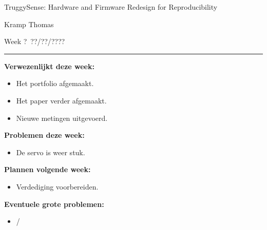 \documentclass[11pt,a4paper]{article}
\newcommand{\documenttitle}{TruggySense: Hardware and Firmware Redesign for Reproducibility}
\newcommand{\documentauthor}{Kramp Thomas}
\newcommand{\HUGE}{\fontsize{30}{30}\selectfont}
\providecommand{\ReportDate}{??/??/????}
\providecommand{\ReportWeek}{?}
\begin{document}
{\HUGE \documenttitle \par}

\vspace{-0.6em}
{\large \documentauthor \par}

\vspace{0.4em}
Week \ReportWeek\ \ReportDate

\vspace{-1.6em}
\noindent\rule{\textwidth}{0.4pt}


\vspace{1.5em}
\textbf{Verwezenlijkt deze week:}
\begin{itemize}
    \item Het portfolio afgemaakt.
    \item Het paper verder afgemaakt.
    \item Nieuwe metingen uitgevoerd.
\end{itemize}


\vspace{1em}
\textbf{Problemen deze week:}
\begin{itemize}
    \item De servo is weer stuk.
\end{itemize}


\vspace{1em}
\textbf{Plannen volgende week:}
\begin{itemize}
    \item Verdediging voorbereiden.
\end{itemize}


\vspace{1em}
\textbf{Eventuele grote problemen:}
\begin{itemize}
    \item /
\end{itemize}
\end{document}
